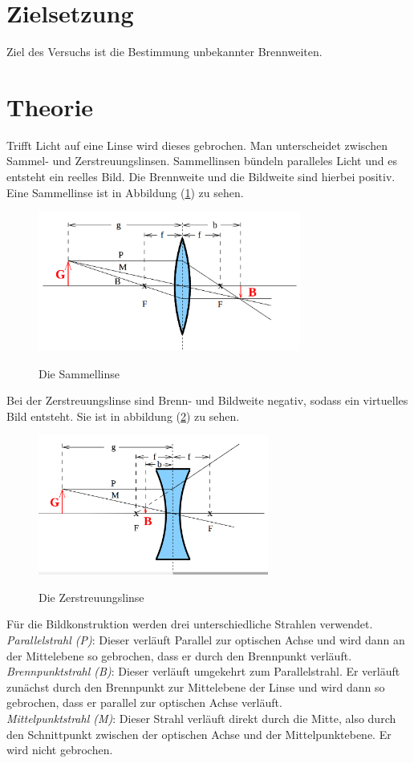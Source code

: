
\section{Zielsetzung}
Ziel des Versuchs ist die Bestimmung unbekannter Brennweiten.

\section{Theorie}
Trifft Licht auf eine Linse wird dieses gebrochen.
Man unterscheidet zwischen Sammel- und Zerstreuungslinsen.
Sammellinsen bündeln paralleles Licht und es entsteht ein reelles Bild.
Die Brennweite und die Bildweite sind hierbei positiv.
Eine Sammellinse ist in Abbildung (\ref{fig:sam}) zu sehen.

\begin{figure}
\centering
\includegraphics[height=4.60cm]{sammellinse.png}
\caption{Die Sammellinse}\cite{on1}
\label{fig:sam}
\end{figure}

Bei der Zerstreuungslinse sind Brenn- und Bildweite negativ,
sodass ein virtuelles Bild entsteht.
Sie ist in abbildung (\ref{fig:zer}) zu sehen.


\begin{figure}
\centering
\includegraphics[height=4.60cm]{zerstreungslinse.png}
\caption{Die Zerstreuungslinse}\cite{on1}
\label{fig:zer}
\end{figure}

Für die Bildkonstruktion werden drei unterschiedliche Strahlen verwendet.\\
\emph{Parallelstrahl (P)}: Dieser verläuft Parallel zur optischen Achse und wird dann an
der Mittelebene so gebrochen, dass er durch den Brennpunkt verläuft.\\
\emph{Brennpunktstrahl (B)}: Dieser verläuft umgekehrt zum Parallelstrahl.
Er verläuft zunächst durch den Brennpunkt zur Mittelebene der Linse
und wird dann so gebrochen, dass er parallel zur optischen Achse verläuft.\\
\emph{Mittelpunktstrahl (M)}: Dieser Strahl verläuft direkt durch die Mitte,
also durch den Schnittpunkt zwischen der optischen Achse und der Mittelpunktebene.
Er wird nicht gebrochen.

